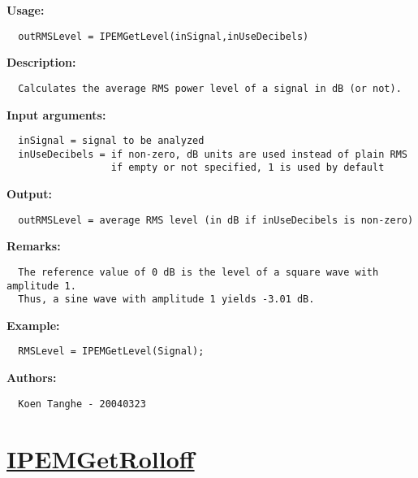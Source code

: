 \textbf{Usage:}
\begin{verbatim}  outRMSLevel = IPEMGetLevel(inSignal,inUseDecibels)

\end{verbatim}
\textbf{Description:}
\begin{verbatim}  Calculates the average RMS power level of a signal in dB (or not).

\end{verbatim}
\textbf{Input arguments:}
\begin{verbatim}  inSignal = signal to be analyzed
  inUseDecibels = if non-zero, dB units are used instead of plain RMS
                  if empty or not specified, 1 is used by default

\end{verbatim}
\textbf{Output:}
\begin{verbatim}  outRMSLevel = average RMS level (in dB if inUseDecibels is non-zero)

\end{verbatim}
\textbf{Remarks:}
\begin{verbatim}  The reference value of 0 dB is the level of a square wave with amplitude 1.
  Thus, a sine wave with amplitude 1 yields -3.01 dB.

\end{verbatim}
\textbf{Example:}
\begin{verbatim}  RMSLevel = IPEMGetLevel(Signal);

\end{verbatim}
\textbf{Authors:}
\begin{verbatim}  Koen Tanghe - 20040323
\end{verbatim}


\newpage
\section*{\hyperlink{Concepts:IPEMGetRolloff}{IPEMGetRolloff}}
\hypertarget{FuncRef:IPEMGetRolloff}{}

